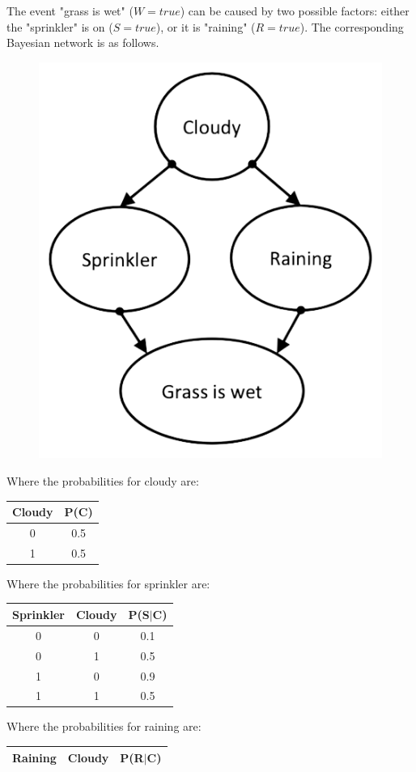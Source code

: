 \documentclass[12pt, a4paper]{report}
\begin{document}
    \begin{example}
        The event "grass is wet" ($W=true$) can be caused by two possible factors: either the "sprinkler" is on ($S=true$), or it is "raining" ($R=true$). 
        The corresponding Bayesian network is as follows.
        \begin{figure}[H]
            \centering
            \includegraphics[width=0.25\linewidth]{images/sprinkler.png}
        \end{figure}
        Where the probabilities for cloudy are: 
        \begin{table}[H]
            \centering
            \begin{tabular}{cc}
            \hline
            \textbf{Cloudy} & \textbf{P(C)} \\ \hline
            0      & 0.5  \\
            1      & 0.5  \\ \hline
            \end{tabular}
        \end{table}
        Where the probabilities for sprinkler are: 
        \begin{table}[H]
            \centering
            \begin{tabular}{ccc}
            \hline
            \textbf{Sprinkler} & \textbf{Cloudy} & \textbf{P(S$|$C)} \\ \hline
            0         & 0      & 0.1  \\
            0         & 1      & 0.5  \\
            1         & 0      & 0.9  \\
            1         & 1      & 0.5  \\ \hline
            \end{tabular}
        \end{table}
        Where the probabilities for raining are: 
        \begin{table}[H]
            \centering
            \begin{tabular}{ccc}
            \hline
            \textbf{Raining} & \textbf{Cloudy} & \textbf{P(R$|$C)} \\ \hline

\end{tabular}
\end{table}
\end{example}
\end{document}
